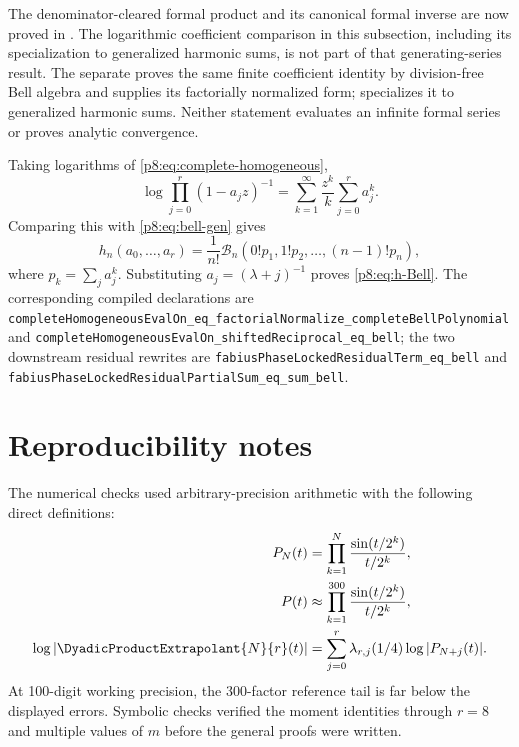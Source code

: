 \documentclass[11pt]{article}
\numberwithin{equation}{section}
\theoremstyle{definition}
\theoremstyle{remark}
\begin{document}
The denominator-cleared formal product and its canonical formal inverse are
now proved in .  The logarithmic
coefficient comparison in this subsection, including its specialization to
generalized harmonic sums, is not part of that generating-series result.
The separate  proves the same finite
coefficient identity by division-free Bell algebra and supplies its
factorially normalized form;  specializes
it to generalized harmonic sums.  Neither statement evaluates an infinite
formal series or proves analytic convergence.

Taking logarithms of \cref{p8:eq:complete-homogeneous},
\[
\log\prod_{j=0}^{r}(1-a_jz)^{-1}
=\sum_{k=1}^{\infty}\frac{z^k}{k}\sum_{j=0}^{r}a_j^k.
\]
Comparing this with \cref{p8:eq:bell-gen} gives
\[
h_n(a_0,\ldots,a_r)
=\frac1{n!}\mathcal B_n\left(
0!p_1,1!p_2,\ldots,(n-1)!p_n\right),
\]
where $p_k=\sum_j a_j^k$. Substituting $a_j=(\lambda+j)^{-1}$ proves \cref{p8:eq:h-Bell}.
The corresponding compiled declarations are
\nolinkurl{completeHomogeneousEvalOn_eq_factorialNormalize_completeBellPolynomial}
and \nolinkurl{completeHomogeneousEvalOn_shiftedReciprocal_eq_bell}; the two
downstream residual rewrites are
\nolinkurl{fabiusPhaseLockedResidualTerm_eq_bell} and
\nolinkurl{fabiusPhaseLockedResidualPartialSum_eq_sum_bell}.

\section{Reproducibility notes}
\label{p8:app:repro}

The numerical checks used arbitrary-precision arithmetic with the following direct definitions:
\begin{align*}
P_N(t)&=\prod_{k=1}^{N}\frac{\sin(t/2^k)}{t/2^k},\\
P(t)&\approx\prod_{k=1}^{300}\frac{\sin(t/2^k)}{t/2^k},\\
\log|\DyadicProductExtrapolant{N}{r}(t)|
&=\sum_{j=0}^{r}\lambda_{r,j}(1/4)\log|P_{N+j}(t)|.
\end{align*}
At 100-digit working precision, the 300-factor reference tail is far below the displayed errors. Symbolic checks verified the moment identities through $r=8$ and multiple values of $m$ before the general proofs were written.
\end{document}
